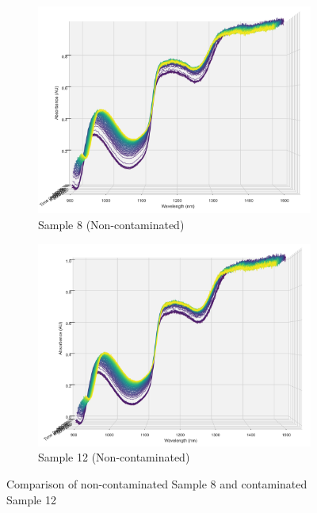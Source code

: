 \documentclass[12pt]{report}
\begin{document}
\begin{figure}[!h]
    \centering
    \begin{subfigure}[b]{0.49\textwidth}
        \centering
        \includegraphics[width=\textwidth]{Images/Sample8_1-n-front.png}  %
        \caption{Sample 8 (Non-contaminated)}
        \label{fig:sample8-front}
    \end{subfigure}
    \hfill
    \begin{subfigure}[b]{0.49\textwidth}
        \centering
        \includegraphics[width=\textwidth]{Images/Sample12_1-n_plot.png}  %
        \caption{Sample 12 (Non-contaminated)}
        \label{fig:sample12-front}
    \end{subfigure}
    \caption{Comparison of non-contaminated Sample 8 and contaminated Sample 12}
    \label{fig:spectra_comp}
\end{figure}
\end{document}
